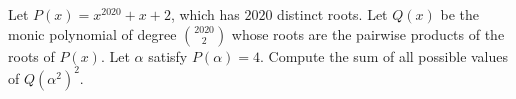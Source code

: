Let $P(x)=x^{2020}+x+2$,  which has $2020$ distinct roots. Let $Q(x)$ be the monic polynomial of degree $\binom{2020}{2}$ whose roots are the pairwise products of the roots of $P(x)$. Let $\alpha$ satisfy $P(\alpha)=4$. Compute the sum of all possible values of $Q(\alpha^2)^2$.